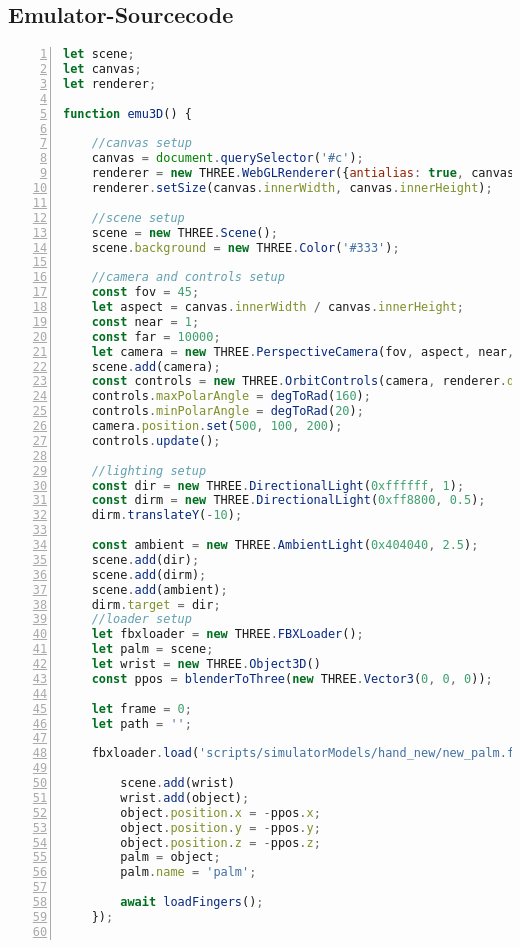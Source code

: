 \documentclass[paper=a4,12pt]{scrreprt}
\begin{document}
\subsection{Emulator-Sourcecode}
\begin{lstlisting}[caption={Emulator-Sourcecode}, captionpos=b, label={listing:emu_source},language=javascript, numbers=left,
  stepnumber=1]
  let scene;
let canvas;
let renderer;

function emu3D() {

    //canvas setup
    canvas = document.querySelector('#c');
    renderer = new THREE.WebGLRenderer({antialias: true, canvas});
    renderer.setSize(canvas.innerWidth, canvas.innerHeight);

    //scene setup
    scene = new THREE.Scene();
    scene.background = new THREE.Color('#333');

    //camera and controls setup
    const fov = 45;
    let aspect = canvas.innerWidth / canvas.innerHeight;
    const near = 1;
    const far = 10000;
    let camera = new THREE.PerspectiveCamera(fov, aspect, near, far);
    scene.add(camera);
    const controls = new THREE.OrbitControls(camera, renderer.domElement)
    controls.maxPolarAngle = degToRad(160);
    controls.minPolarAngle = degToRad(20);
    camera.position.set(500, 100, 200);
    controls.update();

    //lighting setup
    const dir = new THREE.DirectionalLight(0xffffff, 1);
    const dirm = new THREE.DirectionalLight(0xff8800, 0.5);
    dirm.translateY(-10);

    const ambient = new THREE.AmbientLight(0x404040, 2.5);
    scene.add(dir);
    scene.add(dirm);
    scene.add(ambient);
    dirm.target = dir;
    //loader setup
    let fbxloader = new THREE.FBXLoader();
    let palm = scene;
    let wrist = new THREE.Object3D()
    const ppos = blenderToThree(new THREE.Vector3(0, 0, 0));

    let frame = 0;
    let path = '';

    fbxloader.load('scripts/simulatorModels/hand_new/new_palm.fbx', async function (object) {

        scene.add(wrist)
        wrist.add(object);
        object.position.x = -ppos.x;
        object.position.y = -ppos.y;
        object.position.z = -ppos.z;
        palm = object;
        palm.name = 'palm';

        await loadFingers();
    });


\end{lstlisting}
\end{document}
